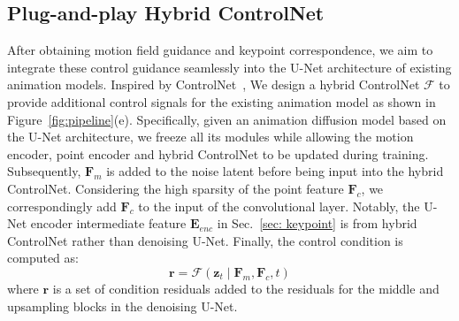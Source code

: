 \subsection{Plug-and-play Hybrid ControlNet}
\label{sec: controlnet}
After obtaining motion field guidance and keypoint correspondence, we aim to integrate these control guidance seamlessly into the U-Net architecture of existing animation models.
Inspired by ControlNet~\citep{zhang2023adding}, We design a hybrid ControlNet $\mathcal{F}$ to provide additional control signals for the existing animation model as shown in Figure~\ref{fig:pipeline}(e).
Specifically, given an animation diffusion model based on the U-Net architecture, we freeze all its modules while allowing the motion encoder, point encoder and hybrid ControlNet to be updated during training. 
Subsequently, $\mathbf{F}_m$ is added to the noise latent before being input into the hybrid ControlNet. Considering the high sparsity of the point feature $\mathbf{F}_c$, we correspondingly add $\mathbf{F}_c$ to the input of the convolutional layer. Notably, the U-Net encoder intermediate feature $\mathbf{E}_{enc}$ in Sec.~\ref{sec: keypoint} is from hybrid ControlNet rather than denoising U-Net. Finally, 
the control condition is computed as:
\begin{equation}
    \boldsymbol{r}=\mathcal{F}(\boldsymbol{z}_{{t}} \mid \mathbf{F}_m, \mathbf{F}_c, {t})
\end{equation}
where $\boldsymbol{r}$ is a set of condition residuals added to the residuals for the middle and upsampling blocks in the denoising U-Net.